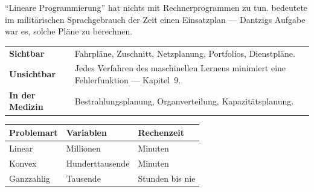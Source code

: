 \begin{geschichte}
\enquote{Lineare Programmierung} hat nichts mit Rechnerprogrammen zu tun.  bedeutete im militärischen Sprachgebrauch der Zeit einen Einsatzplan --- Dantzigs Aufgabe war es, solche Pläne zu berechnen.

\begin{center}
\begin{minipage}{0.9\textwidth}
\end{minipage}
\end{center}
\end{geschichte}

\begin{forschung}
\begin{center}
{\small
\renewcommand{\arraystretch}{1.45}
\begin{tabular}{@{}P{2.8cm}P{5.4cm}@{}}
\toprule
\textbf{Sichtbar} & Fahrpläne, Zuschnitt, Netzplanung, Portfolios, Dienstpläne.\\
\textbf{Unsichtbar} & Jedes Verfahren des maschinellen Lernens minimiert eine Fehlerfunktion --- Kapitel~9.\\
\textbf{In der Medizin} & Bestrahlungsplanung, Organverteilung, Kapazitätsplanung.\\
\bottomrule
\end{tabular}}
\end{center}

\begin{center}
{\small
\renewcommand{\arraystretch}{1.45}
\begin{tabular}{@{}P{2.4cm}P{2.8cm}P{2.6cm}@{}}
\toprule
\textbf{Problemart} & \textbf{Variablen} & \textbf{Rechenzeit}\\
\midrule
Linear & Millionen & \textcolor{gruen}{Minuten}\\
Konvex & Hundert\-tausende & \textcolor{gruen}{Minuten}\\
Ganzzahlig & Tausende & \textcolor{akzent}{Stunden bis nie}\\
\bottomrule
\end{tabular}}
\end{center}

\begin{center}
\begin{minipage}{0.88\textwidth}
\end{minipage}
\end{center}


\end{forschung}
